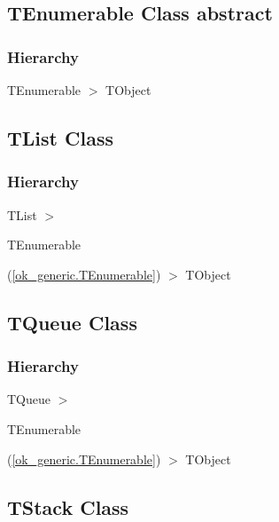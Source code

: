 \documentclass{report}
\newif\ifpdf
\begin{document}
\subsection*{TEnumerable Class abstract}
\fi
\label{ok_generic.TEnumerable}
\subsubsection*{\large{\textbf{Hierarchy}}\normalsize\hspace{1ex}\hfill}
TEnumerable {$>$} TObject
\ifpdf
\subsection*{\large{\textbf{TList Class}}\normalsize\hspace{1ex}\hrulefill}
\else
\subsection*{TList Class}
\fi
\label{ok_generic.TList}
\subsubsection*{\large{\textbf{Hierarchy}}\normalsize\hspace{1ex}\hfill}
TList {$>$} \begin{ttfamily}TEnumerable\end{ttfamily}(\ref{ok_generic.TEnumerable}) {$>$} 
TObject
\ifpdf
\subsection*{\large{\textbf{TQueue Class}}\normalsize\hspace{1ex}\hrulefill}
\else
\subsection*{TQueue Class}
\fi
\label{ok_generic.TQueue}
\subsubsection*{\large{\textbf{Hierarchy}}\normalsize\hspace{1ex}\hfill}
TQueue {$>$} \begin{ttfamily}TEnumerable\end{ttfamily}(\ref{ok_generic.TEnumerable}) {$>$} 
TObject
\ifpdf
\subsection*{\large{\textbf{TStack Class}}\normalsize\hspace{1ex}\hrulefill}
\else
\end{document}
